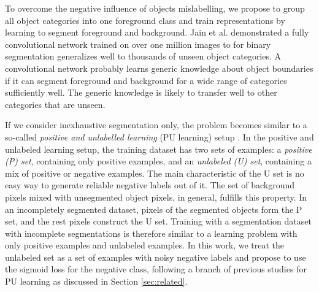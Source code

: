 To overcome the negative influence of objects mislabelling, we propose to group all object categories into one foreground class and train representations by learning to segment foreground and background.
Jain et al. \cite{jain2017pixel} demonstrated a fully convolutional network trained on over one million images to for binary segmentation generalizes well to thousands of unseen object categories.
A convolutional network probably learns generic knowledge about object boundaries if it can segment foreground and background for a wide range of categories sufficiently well.
The generic knowledge is likely to transfer well to other categories that are unseen.




If we consider inexhaustive segmentation only, the problem becomes similar to a so-called \textit{positive and unlabelled learning} (PU learning) setup \cite{li2005learning}.
In the positive and unlabeled learning setup, the training dataset has two sets of examples: a \textit{positive (P) set}, containing only positive examples, and an \textit{unlabeled (U) set}, containing a mix of positive or negative examples.
The main characteristic of the U set is no easy way to generate reliable negative labels out of it.
The set of background pixels mixed with unsegmented object pixels, in general, fulfills this property.
In an incompletely segmented dataset, pixels of the segmented objects form the P set, and the rest pixels construct the U set.
Training with a segmentation dataset with incomplete segmentations is therefore similar to a learning problem with only positive examples and unlabeled examples.
In this work, we treat the unlabeled set as a set of examples with noisy negative labels and propose to use the sigmoid loss for the negative class, following a branch of previous studies for PU learning as discussed in Section \ref{sec:related}.

